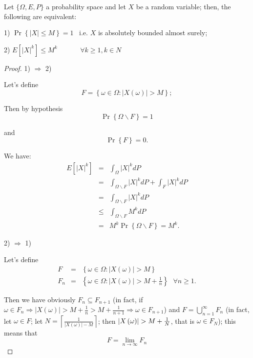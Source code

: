 \documentclass[12pt]{article}
\begin{document}
Let $\{\Omega ,E,P\}$ a probability space and let $X$ be a random
variable; then, the following are equivalent:

1) $\Pr \left\{ \left\vert X\right\vert \leq M\right\} =1$ \ i.e. $X$ is
absolutely bounded almost surely;

2) $E[\left\vert X\right\vert ^{k}]\leq M^{k}$ \ \ \ \ \ \ $\forall k\geq
1,k\in N$


\begin{proof}

1) $\Longrightarrow $ 2)

Let's define%
\[
F=\left\{ \omega \in \Omega :\left\vert X\left( \omega \right) \right\vert
>M\right\} ;
\]

Then by hypothesis 
\[
\Pr \left\{ \Omega \backslash F\right\} =1
\]

and
\[
\Pr \left\{ F\right\} =0.
\]

We have:
\begin{eqnarray*}
E[\left\vert X\right\vert ^{k}] &=&\int_{\Omega }\left\vert X\right\vert
^{k}dP \\
&=&\int_{\Omega \backslash F}\left\vert X\right\vert
^{k}dP+\int_{F}\left\vert X\right\vert ^{k}dP \\
&=&\int_{\Omega \backslash F}\left\vert X\right\vert ^{k}dP \\
&\leq &\int_{\Omega \backslash F}M^{k}dP \\
&=&M^{k}\Pr \left\{ \Omega \backslash F\right\} =M^{k}.
\end{eqnarray*}

2) $\Longrightarrow $ 1)

Let's define
\begin{eqnarray*}
F &=&\left\{ \omega \in \Omega :\left\vert X\left( \omega \right)
\right\vert >M\right\}  \\
F_{n} &=&\left\{ \omega \in \Omega :\left\vert X\left( \omega \right)
\right\vert >M+\frac{1}{n}\right\} \text{ \ }\forall n\geq 1.
\end{eqnarray*}

Then we have obviously $F_{n}\subseteq F_{n+1}$ (in fact, if $\omega \in
F_{n}\Longrightarrow \left\vert X\left( \omega \right) \right\vert >M+\frac{1%
}{n}>M+\frac{1}{n+1}\Longrightarrow \omega \in F_{n+1}$) and $%
F=\bigcup_{n=1}^{\infty }F_{n}$ (in fact, let $\omega \in F$; let $%
N=\left\lceil \frac{1}{\left\vert X\left( \omega \right) \right\vert -M}%
\right\rceil $; then $\left\vert X\left( \omega \right) \right\vert >M+\frac{%
1}{N}$, that is $\omega \in F_{N}$); this means that%
\[
F=\lim_{n\rightarrow \infty }F_{n}
\]


\end{proof}
\end{document}
